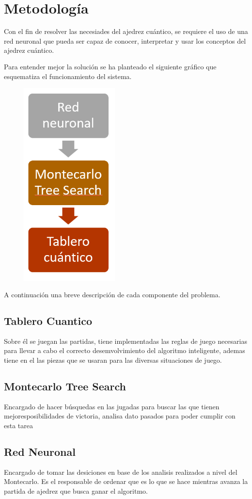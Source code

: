 \section{Metodología}
Con el fin de resolver las necesiades del ajedrez cuántico, se requiere el uso de una
red neuronal que pueda ser capaz de conocer, interpretar y usar los 
conceptos del ajedrez cuántico.

Para entender mejor la solución se ha 
planteado el siguiente gráfico que esquematiza 
el funcionamiento del sistema.

\begin{figure}
	\includegraphics[width=5cm]{Imagenes/jerarquia_del_algoritmo.png}
\end{figure}

A continuación una breve descripción de cada componente del problema.

\subsection{Tablero Cuantico}
Sobre él se juegan las partidas, tiene implementadas las reglas de juego
necesarias para llevar a cabo el correcto desemvolvimiento del algoritmo inteligente,
ademas tiene en el las piezas que se usaran para las diversas situaciones de juego.
\subsection{Montecarlo Tree Search}
Encargado de hacer búsquedas en las jugadas para 
buscar las que tienen mejoresposibilidades de victoria, 
analisa dato pasados para poder cumplir con esta tarea
\subsection{Red Neuronal}
Encargado de tomar las desiciones en base de los 
analisis realizados a nivel del Montecarlo. Es el 
responsable de ordenar que es lo que se hace mientras 
avanza la partida de ajedrez que busca ganar el algoritmo.

